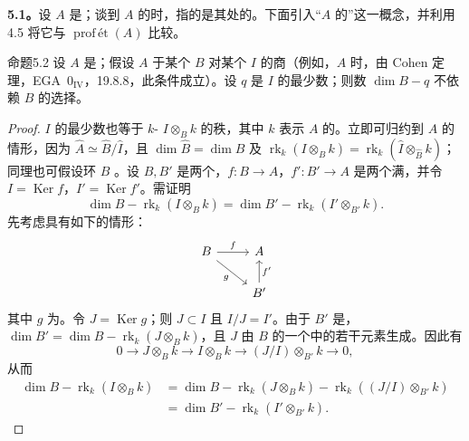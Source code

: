 \textbf{5.1。}设 $A$ 是；谈到 $A$ 的时，指的是其处的。下面引入“$A$ 的”这一概念，并利用 4.5 将它与 $\operatorname{prof\,\text{ét}}(A)$ 比较。

\begin{SGAresult}{命题}{5.2}
设 $A$ 是；假设 $A$ 于某个 $B$ 对某个 $I$ 的商（例如，$A$ 时，由 Cohen 定理，EGA~$0_{\mathrm{IV}}$，19.8.8，此条件成立）。设 $q$ 是 $I$ 的最少数；则数 $\dim B-q$ 不依赖 $B$ 的选择。
\end{SGAresult}
\begin{proof}
$I$ 的最少数也等于 $k$- $I\otimes_Bk$ 的秩，其中 $k$ 表示 $A$ 的。立即可归约到 $A$ 的情形，因为 $\widehat A\simeq\widehat B/\widehat I$，且 $\dim\widehat B=\dim B$ 及 $\operatorname{rk}_k(I\otimes_Bk)=\operatorname{rk}_k(\widehat I\otimes_{\widehat B}k)$；同理也可假设环 $B$ 。设 $B,B'$ 是两个，$f:B\to A$，$f':B'\to A$ 是两个满，并令 $I=\operatorname{Ker}f$，$I'=\operatorname{Ker}f'$。需证明
\[
\dim B-\operatorname{rk}_k(I\otimes_Bk)
=\dim B'-\operatorname{rk}_k(I'\otimes_{B'}k).
\]
先考虑具有如下的情形：
\[
\begin{tikzcd}
B\arrow[r,"f"]\arrow[dr,"g"']&A\\
&B'\arrow[u,"f'"']
\end{tikzcd}
\]
其中 $g$ 为。令 $J=\operatorname{Ker}g$；则 $J\subset I$ 且 $I/J=I'$。由于 $B'$ 是，$\dim B'=\dim B-\operatorname{rk}_k(J\otimes_Bk)$，且 $J$ 由 $B$ 的一个中的若干元素生成。因此有
\[
0\longrightarrow J\otimes_Bk\longrightarrow I\otimes_Bk
\longrightarrow (J/I)\otimes_{B'}k\longrightarrow0,
\]
从而
\begin{align*}
\dim B-\operatorname{rk}_k(I\otimes_Bk)
&=\dim B-\operatorname{rk}_k(J\otimes_Bk)
-\operatorname{rk}_k((J/I)\otimes_{B'}k)\\
&=\dim B'-\operatorname{rk}_k(I'\otimes_{B'}k).
\end{align*}

\end{proof}
